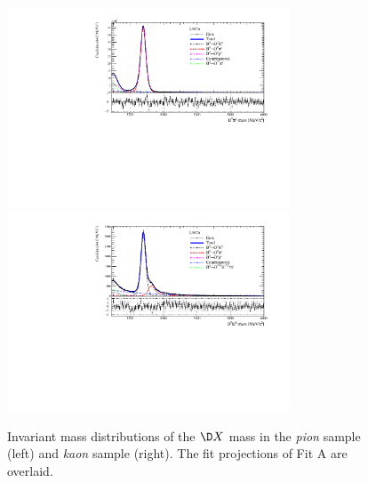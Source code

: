 \begin{figure}[tbp]
    \centering
    \includegraphics[width=0.75\textwidth]{08MassFit/figs/MDFit_BeautyMass_Bd2DPi_withPulls.pdf}
    \includegraphics[width=0.75\textwidth]{08MassFit/figs/MDFit_BeautyMass_Bd2DK_withPulls.pdf}
    \caption{Invariant mass distributions of the $\D X$ mass in the \emph{pion} sample (left) and \emph{kaon} sample (right).
    The fit projections of Fit A are overlaid.}
    \label{fig:MassFitPlot}
\end{figure}

